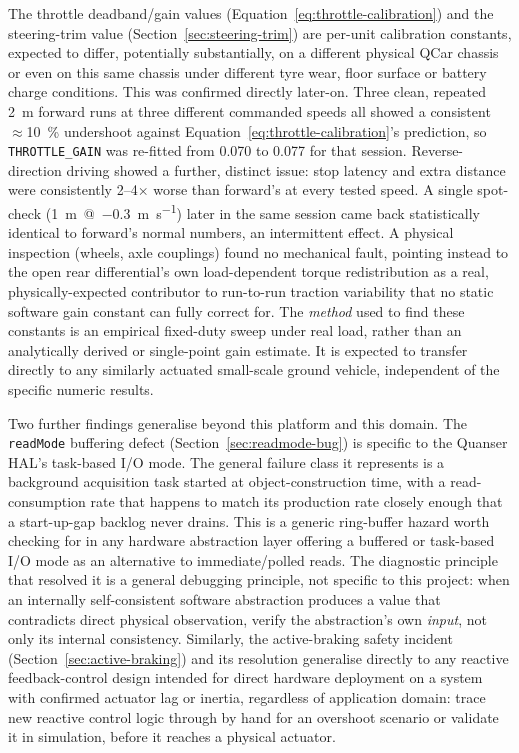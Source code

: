The throttle deadband/gain values (Equation~\ref{eq:throttle-calibration})
and the steering-trim value (Section~\ref{sec:steering-trim}) are
per-unit calibration constants, expected to differ, potentially
substantially, on a different physical QCar chassis or even on
this same chassis under different tyre wear, floor surface or
battery charge conditions. This was confirmed directly later-on.
Three clean, repeated \SI{2}{\meter} forward runs
at three different commanded speeds all showed a consistent
$\approx$\SI{10}{\percent} undershoot against
Equation~\ref{eq:throttle-calibration}'s prediction, so
\texttt{THROTTLE\_GAIN} was re-fitted from \num{0.070} to
\num{0.077} for that session. Reverse-direction driving showed a
further, distinct issue: stop latency and extra distance were
consistently 2--4$\times$ worse than forward's at every tested speed.
A single spot-check
(\SI{1}{\meter}~@~\SI{-0.3}{\meter\per\second}) later in the same
session came back statistically identical to forward's normal
numbers, an intermittent effect. A physical inspection (wheels,
axle couplings) found no mechanical fault, pointing instead to the
open rear differential's own load-dependent torque redistribution as
a real, physically-expected contributor to run-to-run traction
variability that no static software gain constant can fully correct
for. The \emph{method} used to find these constants is an empirical
fixed-duty sweep under real load, rather than an analytically derived
or single-point gain estimate. It is expected to transfer directly to
any similarly actuated small-scale ground vehicle, independent of the
specific numeric results.

Two further findings generalise beyond this platform and this
domain. The \texttt{readMode} buffering defect
(Section~\ref{sec:readmode-bug}) is specific to the Quanser HAL's
task-based I/O mode. The general failure class it represents is a
background acquisition task started at object-construction time,
with a read-consumption rate that happens to match its production
rate closely enough that a start-up-gap backlog never drains. This is
a generic ring-buffer hazard worth checking for in any hardware
abstraction layer offering a buffered or task-based I/O mode as an
alternative to immediate/polled reads. The diagnostic principle that
resolved it is a general debugging principle, not specific to this
project: when an internally self-consistent software abstraction
produces a value that contradicts direct physical observation,
verify the abstraction's own \emph{input}, not only its internal
consistency. Similarly, the active-braking safety
incident (Section~\ref{sec:active-braking}) and its resolution
generalise directly to any reactive feedback-control design intended
for direct hardware deployment on a system with confirmed actuator
lag or inertia, regardless of application domain: trace new reactive
control logic through by hand for an overshoot scenario or validate
it in simulation, before it reaches a physical actuator.

